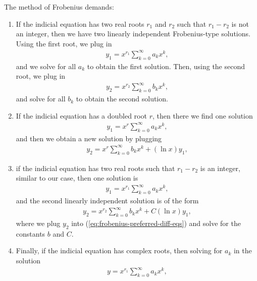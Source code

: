 \begin{enumerate}[label={(\arabic*)}]
    The method of Frobenius demands:
    \begin{enumerate}[label={(\roman*)}]
        \item If the indicial equation has two real roots $r_1$ and $r_2$ such that $r_1-r_2$ is not an integer, then we have two linearly independent Frobenius-type solutions. Using the first root, we plug in
        \begin{align}
            y_1=x^{r_1}\sum_{k=0}^\infty a_kx^k,\label{eq:first-frebonius-type-1}
        \end{align}
        and we solve for all $a_k$ to obtain the first solution. Then, using the second root, we plug in
        \begin{align}
            y_2=x^{r_2}\sum_{k=0}^\infty b_kx^k,\label{eq:second-frebonius-type-1}
        \end{align}
        and solve for all $b_k$ to obtain the second solution.
        \item If the indicial equation has a doubled root $r$, then there we find one solution
        \begin{align}
            y_1=x^{r}\sum_{k=0}^\infty a_kx^k,\label{eq:first-frebonius-t2}
        \end{align}
        and then we obtain a new solution by plugging
        \begin{align}
            y_2=x^{r}\sum_{k=0}^\infty b_kx^k+(\ln x)y_1,\label{eq:second-frebonius-type-2}
        \end{align}
        \item if the indicial equation has two real roots such that $r_1-r_2$ is an integer, similar to our case, then one solution is
        \begin{align}
            y_1=x^{r_1}\sum_{k=0}^\infty a_kx^k,\label{eq:first-frebonius-type-3}
        \end{align}
        and the second linearly independent solution is of the form
        \begin{align}
            y_2=x^{r_2}\sum_{k=0}^\infty b_kx^k + C(\ln{x})y_1,\label{eq:second-frebonius-type-3}
        \end{align}
        where we plug $y_2$ into (\ref{eq:frobenius-preferred-diff-eqs}) and solve for the constants $b$ and $C$.
        \item Finally, if the indicial equation has complex roots, then solving for $a_k$ in the solution
        \begin{align}
            y=x^{r_1}\sum_{k=0}^\infty a_kx^k,\label{eq:first-frebonius-type-4}

\end{align}
\end{enumerate}
\end{enumerate}
